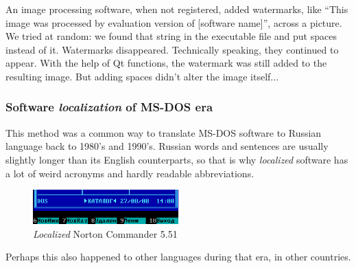 An image processing software, when not registered, added watermarks,
like ``This image was processed by evaluation version of [software name]'', across a picture.
We tried at random: we found that string in the executable file and put spaces instead of it.
Watermarks disappeared.
Technically speaking, they continued to appear.
With the help of Qt functions, the watermark was still added to the resulting image.
But adding spaces didn't alter the image itself...

\subsubsection{Software \emph{localization} of MS-DOS era}

This method was a common way to translate MS-DOS software to Russian language back to 1980's and 1990's.
Russian words and sentences are usually slightly longer than its English counterparts, so that is why \emph{localized}
software has a lot of weird acronyms and hardly readable abbreviations.

\begin{figure}[H]
\centering
\includegraphics[width=0.5\textwidth]{patterns/01_helloworld/Norton_Commander_v5_51.png}
\caption{\emph{Localized} Norton Commander 5.51}
\end{figure}

Perhaps this also happened to other languages during that era, in other countries.
